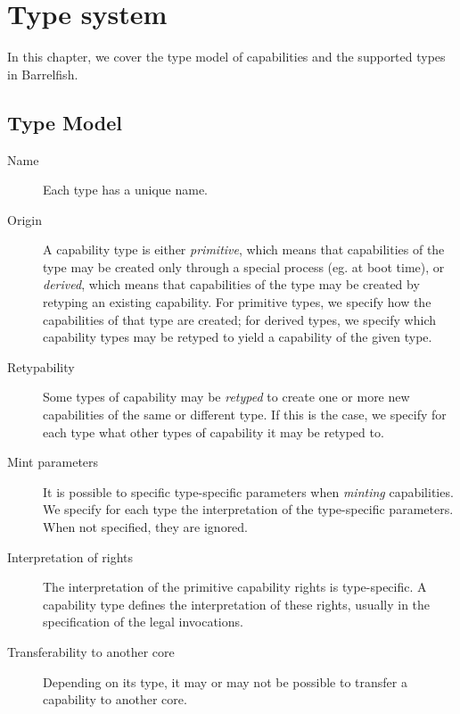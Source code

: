 \chapter{Type system}\label{chap:type_system}

In this chapter, we cover the type model of capabilities and the
supported types in Barrelfish.

\section{Type Model}
    
\begin{description}
\item[Name] Each type has a unique name.

\item[Origin] A capability type is either \emph{primitive}, which
  means that capabilities of the type may be created only through a
  special process (eg. at boot time), or \emph{derived}, which means
  that capabilities of the type may be created by retyping an existing
  capability. For primitive types, we specify how the capabilities of
  that type are created; for derived types, we specify which
  capability types may be retyped to yield a capability of the given
  type.

\item[Retypability] Some types of capability may be \emph{retyped} to
  create one or more new capabilities of the same or different
  type. If this is the case, we specify for each type what other types
  of capability it may be retyped to.

\item[Mint parameters] It is possible to specific type-specific
  parameters when \emph{minting} capabilities. We specify for each
  type the interpretation of the type-specific parameters. When not
  specified, they are ignored.

\item[Interpretation of rights] The interpretation of the primitive
  capability rights is type-specific. A capability type defines the
  interpretation of these rights, usually in the specification of the
  legal invocations.

\item[Transferability to another core] Depending on its type, it may
  or may not be possible to transfer a capability to another core.


\end{description}

